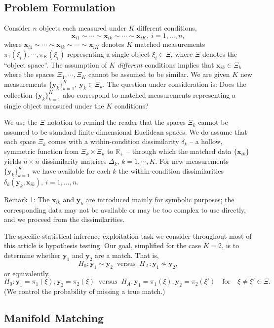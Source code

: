 \documentclass[12pt,xcolor]{article}
\newcommand{\1}{\ensuremath{\mbox{{\bf 1}}}}
\begin{document}
\subsection{Problem Formulation}

Consider $n$ objects each measured under $K$ different conditions,
$$\bm{x}_{i1} \sim \cdots \sim \bm{x}_{ik} \sim \cdots \sim\bm{x}_{iK},\ i = 1, \ldots, n,$$
where $\bm{x}_{i1} \sim \cdots \sim \bm{x}_{ik} \sim \cdots \sim \bm{x}_{iK}$
denotes $K$ matched measurements 
$\pi_1(\xi_i),\cdots,\pi_K(\xi_i)$
representing a single object $\xi_i \in \Xi$,
where $\Xi$ denotes the ``object space''.
The assumption of $K$ {\em different} conditions implies that
$\bm{x}_{ik} \in \Xi_k$
where the spaces $\Xi_1,\cdots,\Xi_K$ cannot be assumed to be similar.
We are given $K$ new measurements $\{\bm{y}_k\}_{k=1}^K,\ \bm{y}_k \in \Xi_k$.
The question under consideration is:
Does the collection $\{\bm{y}_k\}_{k=1}^K$ also correspond to matched measurements representing a single object measured under the $K$ conditions?

We use the $\Xi$ notation to remind the reader that the spaces $\Xi_k$ cannot be assumed to be standard finite-dimensional Euclidean spaces.
We do assume that each space $\Xi_k$ comes with a within-condition dissimilarity $\delta_k$ --
a hollow, symmetric function from $\Xi_k \times \Xi_k$ to $\mathbb{R}_+$ --
through which the matched data $\{\bm{x}_{ik}\}$ yields $n \times n$ dissimilarity matrices $\Delta_k$, $k=1,\cdots,K$.
For new measurements $\{\bm{y}_k\}_{k=1}^K$ we have available for each $k$ the within-condition dissimilarities
$\delta_k(\bm{y}_{k}, \bm{x}_{ik}) , \ i = 1, \ldots, n$.

Remark 1: The $\bm{x}_{ik}$ and $\bm{y}_{k}$ are introduced mainly for symbolic purposes;
the corresponding data may not be available or may be too complex to use directly,
and we proceed from the dissimilarities.

The specific statistical inference exploitation task we consider throughout most of this article is hypothesis testing.
Our goal, simplified for the case $K=2$, is to determine whether $\bm{y}_{1}$ and $\bm{y}_{2}$ are a match.
That is, $$H_0: \bm{y}_{1} \sim \bm{y}_{2} \ \text{ versus } \ H_A: \bm{y}_{1} \nsim \bm{y}_{2},$$
or equivalently,
$$H_0: \bm{y}_{1}=\pi_1(\xi) , \bm{y}_{2}=\pi_2(\xi) \ \text{ versus } \ H_A: \bm{y}_{1}=\pi_1(\xi) , \bm{y}_{2}=\pi_2(\xi') \mbox{ ~ for ~ } \xi \neq \xi' \in \Xi.$$
(We control the probability of missing a true match.)

\subsection{Manifold Matching}
\end{document}
